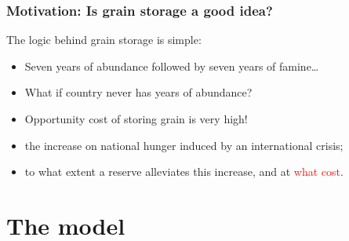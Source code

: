 \documentclass[svgnames]{beamer}
\begin{document}
\begin{frame}
  \frametitle{Motivation: Is grain storage a good idea?}
  The logic behind grain storage is simple:
  \begin{itemize}
    \item<1-3> Seven years of abundance followed by seven years of famine\dots
    \item<2-3> What if country never has years of abundance?
    \item<3> Opportunity cost of storing grain is very high!
  \end{itemize}
  \vspace{2em}
  \begin{itemize}
    \item<5-> the increase on national hunger induced by an international crisis;
    \item<6-> to what extent a reserve alleviates this increase, and at \textcolor{red}{what cost}.
  \end{itemize}
\end{frame}



\section{The model}
\end{document}
